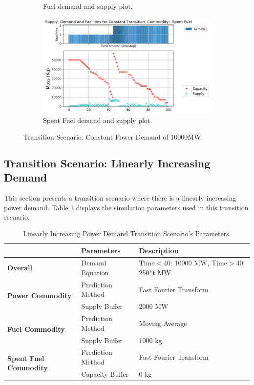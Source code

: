 \documentclass[11pt,letterpaper]{article}
\begin{document}
\begin{figure}[!htbp]
\begin{subfigure}[t]{0.45\textwidth}
        \caption{Fuel demand and supply plot.}
	    \label{fig:constanttransition-fuel}
    \end{subfigure}
    \hfill
    \begin{subfigure}[t]{0.45\textwidth}
        \centering
        \includegraphics[width=\linewidth]{figures/constanttransition-spentfuel.png} 
        \caption{Spent Fuel demand and supply plot.}
        \label{fig:constanttransition-spentfuel}
    \end{subfigure}
    \caption{Transition Scenario: Constant Power Demand of 10000MW.}
\end{figure}

\subsection{Transition Scenario: Linearly Increasing Demand}

This section presents a transition scenario where there is a linearly 
increasing power demand. 
Table \ref{tab:transition-scenario-growing-power} displays the 
simulation parameters used in this transition scenario. 

\begin{table}[!htbp]
	\centering
	\caption {Linearly Increasing Power Demand Transition Scenario's Parameters.}
	\label{tab:transition-scenario-growing-power}
	\begin{tabular}{|l|l|p{4.1cm}|}
		\hline
		& \textbf{Parameters}    & \textbf{Description} \\ \hline
		\textbf{Overall}& Demand Equation & Time$<$40: 10000 MW, Time$>$40: 250*t MW \\ \hline
		\multirow{2}{*}{\textbf{Power Commodity}} & Prediction Method      &  Fast Fourier Transform \\ \cline{2-3} 
		& Supply Buffer          &  2000 MW \\ \hline
		\multirow{2}{*}{\textbf{Fuel Commodity}}  & Prediction Method      &  Moving Average\\ \cline{2-3}
		& Supply Buffer & 1000 kg \\ \hline
		\multirow{2}{*}{\textbf{Spent Fuel Commodity}}  & Prediction Method      &  Fast Fourier Transform \\ \cline{2-3}
		& Capacity Buffer & 0 kg \\ \hline
	\end{tabular}
\end{table}
\end{document}
